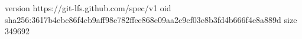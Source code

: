 version https://git-lfs.github.com/spec/v1
oid sha256:3617b4ebc86f4cb9aff98e782ffee868e09aa2c9cf03e8b3fd4b666f4e8a889d
size 349692

